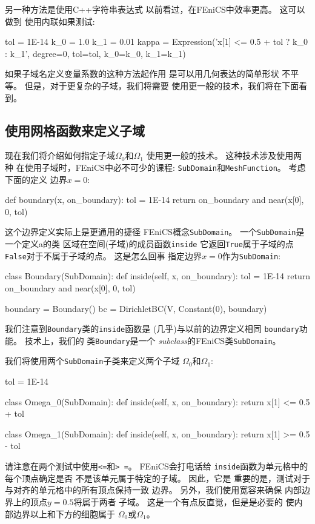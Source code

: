 另一种方法是使用C++字符串表达式
以前看过，在FEniCS中效率更高。 这可以做到
使用内联如果测试:

\begin{python}
tol = 1E-14
k_0 = 1.0
k_1 = 0.01
kappa = Expression('x[1] <= 0.5 + tol ? k_0 : k_1', degree=0,
               tol=tol, k_0=k_0, k_1=k_1)
\end{python}

如果子域名定义变量系数的这种方法起作用
是可以用几何表达的简单形状
不平等。 但是，对于更复杂的子域，我们将需要
使用更一般的技术，我们将在下面看到。


\subsection{使用网格函数来定义子域}


现在我们将介绍如何指定子域$\Omega_0$和$\Omega_1$
使用更一般的技术。 这种技术涉及使用两种
在使用子域时，FEniCS中必不可少的课程:
\texttt{SubDomain}和\texttt{MeshFunction}。 考虑下面的定义
边界$x = 0$:

\begin{python}
def boundary(x, on_boundary):
    tol = 1E-14
    return on_boundary and near(x[0], 0, tol)
\end{python}
这个边界定义实际上是更通用的捷径
FEniCS概念\texttt{SubDomain}。 一个\texttt{SubDomain}是一个定义a的类
区域在空间(子域)的成员函数\texttt{inside}
它返回\texttt{True}属于子域的点
\texttt{False}对于不属于子域的点。 这是怎么回事
指定边界$x = 0$作为\texttt{SubDomain}:

\begin{python}
class Boundary(SubDomain):
    def inside(self, x, on_boundary):
        tol = 1E-14
        return on_boundary and near(x[0], 0, tol)

boundary = Boundary()
bc = DirichletBC(V, Constant(0), boundary)
\end{python}
我们注意到\texttt{Boundary}类的\texttt{inside}函数是
(几乎)与以前的边界定义相同
\texttt{boundary}功能。 技术上，我们的
类\texttt{Boundary}是一个
\emph{subclass}的FEniCS类\texttt{SubDomain}。

我们将使用两个\texttt{SubDomain}子类来定义两个子域
$\Omega_0$和$\Omega_1$:

\begin{python}
tol = 1E-14

class Omega_0(SubDomain):
    def inside(self, x, on_boundary):
        return x[1] <= 0.5 + tol

class Omega_1(SubDomain):
    def inside(self, x, on_boundary):
        return x[1] >= 0.5 - tol
\end{python}
请注意在两个测试中使用\texttt{<=}和\texttt{> =}。 FEniCS会打电话给
\texttt{inside}函数为单元格中的每个顶点确定是否
不是该单元属于特定的子域。 因此，它是
重要的是，测试对于与对齐的单元格中的所有顶点保持一致
边界。 另外，我们使用宽容来确保
内部边界上的顶点$y = 0.5$将属于两者
子域。 这是一个有点反直觉，但是是必要的
使内部边界以上和下方的细胞属于
$\Omega_0$或$\Omega_1$。

